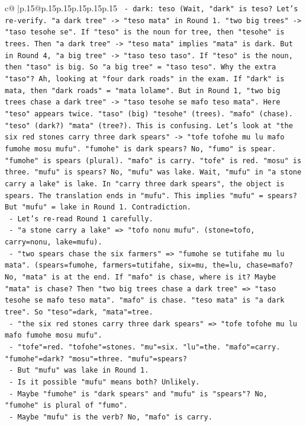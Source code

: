 \documentclass{article}
\begin{document}
{\begin{supertabular}{c@{$\;$}|p{.15\linewidth}@{}p{.15\linewidth}p{.15\linewidth}p{.15\linewidth}p{.15\linewidth}p{.15\linewidth}}
{{{\texttt{  {-} dark: teso (Wait, "dark" is teso? Let's re{-}verify. "a dark tree" {-}> "teso mata" in Round 1. "two big trees" {-}> "taso tesohe se". If "teso" is the noun for tree, then "tesohe" is trees. Then "a dark tree" {-}> "teso mata" implies "mata" is dark. But in Round 4, "a big tree" {-}> "taso teso taso". If "teso" is the noun, then "taso" is big. So "a big tree" = "taso teso". Why the extra "taso"? Ah, looking at "four dark roads" in the exam. If "dark" is mata, then "dark roads" = "mata lolame". But in Round 1, "two big trees chase a dark tree" {-}> "taso tesohe se mafo teso mata". Here "teso" appears twice. "taso" (big) "tesohe" (trees). "mafo" (chase). "teso" (dark?) "mata" (tree?). This is confusing. Let's look at "the six red stones carry three dark spears" {-}> "tofe tofohe mu lu mafo fumohe mosu mufu". "fumohe" is dark spears? No, "fumo" is spear. "fumohe" is spears (plural). "mafo" is carry. "tofe" is red. "mosu" is three. "mufu" is spears? No, "mufu" was lake. Wait, "mufu" in "a stone carry a lake" is lake. In "carry three dark spears", the object is spears. The translation ends in "mufu". This implies "mufu" = spears? But "mufu" = lake in Round 1. Contradiction.} \\
\texttt{  {-} Let's re{-}read Round 1 carefully.} \\
\texttt{    {-} "a stone carry a lake" => "tofo nonu mufu". (stone=tofo, carry=nonu, lake=mufu).} \\
\texttt{    {-} "two spears chase the six farmers" => "fumohe se tutifahe mu lu mata". (spears=fumohe, farmers=tutifahe, six=mu, the=lu, chase=mafo? No, "mata" is at the end. If "mafo" is chase, where is it? Maybe "mata" is chase? Then "two big trees chase a dark tree" => "taso tesohe se mafo teso mata". "mafo" is chase. "teso mata" is "a dark tree". So "teso"=dark, "mata"=tree.} \\
\texttt{    {-} "the six red stones carry three dark spears" => "tofe tofohe mu lu mafo fumohe mosu mufu".} \\
\texttt{      {-} "tofe"=red. "tofohe"=stones. "mu"=six. "lu"=the. "mafo"=carry. "fumohe"=dark? "mosu"=three. "mufu"=spears?} \\
\texttt{      {-} But "mufu" was lake in Round 1.} \\
\texttt{      {-} Is it possible "mufu" means both? Unlikely.} \\
\texttt{      {-} Maybe "fumohe" is "dark spears" and "mufu" is "spears"? No, "fumohe" is plural of "fumo".} \\
\texttt{      {-} Maybe "mufu" is the verb? No, "mafo" is carry.} \\
}}}
\end{supertabular}}
\end{document}
